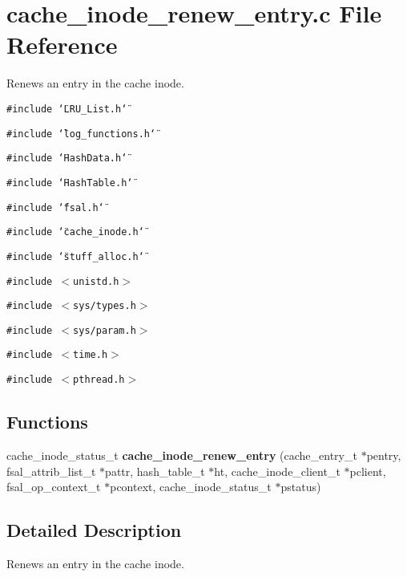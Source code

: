 \section{cache\_\-inode\_\-renew\_\-entry.c File Reference}
\label{cache__inode__renew__entry_8c}
Renews an entry in the cache inode. 

{\tt \#include \char`\"{}LRU\_\-List.h\char`\"{}}\par
{\tt \#include \char`\"{}log\_\-functions.h\char`\"{}}\par
{\tt \#include \char`\"{}Hash\-Data.h\char`\"{}}\par
{\tt \#include \char`\"{}Hash\-Table.h\char`\"{}}\par
{\tt \#include \char`\"{}fsal.h\char`\"{}}\par
{\tt \#include \char`\"{}cache\_\-inode.h\char`\"{}}\par
{\tt \#include \char`\"{}stuff\_\-alloc.h\char`\"{}}\par
{\tt \#include $<$unistd.h$>$}\par
{\tt \#include $<$sys/types.h$>$}\par
{\tt \#include $<$sys/param.h$>$}\par
{\tt \#include $<$time.h$>$}\par
{\tt \#include $<$pthread.h$>$}\par
\subsection*{Functions}
\begin{CompactItemize}
\item 
cache\_\-inode\_\-status\_\-t {\bf cache\_\-inode\_\-renew\_\-entry} (cache\_\-entry\_\-t $\ast$pentry, fsal\_\-attrib\_\-list\_\-t $\ast$pattr, hash\_\-table\_\-t $\ast$ht, cache\_\-inode\_\-client\_\-t $\ast$pclient, fsal\_\-op\_\-context\_\-t $\ast$pcontext, cache\_\-inode\_\-status\_\-t $\ast$pstatus)
\end{CompactItemize}


\subsection{Detailed Description}
Renews an entry in the cache inode. 

